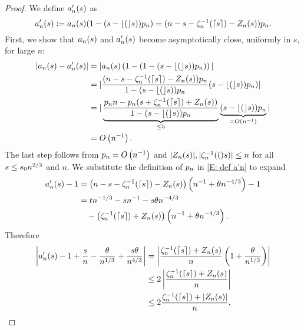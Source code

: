 \begin{proof} \label{P: limit An}
	We define $a'_n(s)$ as
	\begin{equation} \label{E: def a'n}
		a'_n(s) := a_n(s) (1 - (s - \lfloor(\rfloor s))p_n) = (n - s - \zeta^{-1}_n(\lceil s\rceil) - Z_n(s)) p_n.
	\end{equation}
	First, we show that $a_n(s)$ and $a'_n(s)$ become asymptotically close, uniformly in $s$, for large $n$:
	\begin{equation} \label{E: convergence an amn}
	\begin{aligned}
	|a_n(s) - a'_n(s)|
	&= |a_n(s)\left( 1-(1 - (s - \lfloor(\rfloor s))p_n) \right)| \\
	&= | \frac{(n - s - \zeta^{-1}_n(\lceil s\rceil) - Z_n(s))p_n}{1-(s - \lfloor(\rfloor s))p_n} (s - \lfloor(\rfloor s))p_n) | \\
	&= |\underbrace{\frac{p_n n - p_n(s + \zeta^{-1}_n(\lceil s\rceil) + Z_n(s))}{1-(s - \lfloor(\rfloor s))p_n}}_{\leq 5} 
		\underbrace{(s - \lfloor(\rfloor s))p_n}_{=O\left(n^{-1}\right)} |\\
	&= O\left(n^{-1}\right).
	\end{aligned}
	\end{equation}
	The last step follows from $p_n = O\left(n^{-1}\right)$ and $|Z_n(s)|, |\zeta^{-1}_n(()s)| \leq n$ for all $s \leq s_0n^{2 / 3}$ and $n$.
	We substitute the definition of $p_n$ in \eqref{E: def a'n} to expand
	\begin{align*}
	a'_n(s) - 1 
	&= \left( n - s - \zeta^{-1}_n(\lceil s\rceil) - Z_n(s) \right) \left( n^{-1} + \theta n^{-4 / 3} \right) - 1 \\
	&= tn^{-1 / 3} - sn^{-1} - s\theta n^{-4 / 3} \\
	&\quad - \left( \zeta^{-1}_n(\lceil s\rceil) + Z_n(s) \right) \left( n^{-1} + \theta n^{-4 / 3} \right).
	\end{align*}
	Therefore
	\begin{equation} \label{E: an zeta Z / n} 
	\begin{aligned}
	\left| a'_n(s) - 1 + \frac{s}{n} - \frac{\theta}{n^{1 / 3}} + \frac{s\theta}{n^{4 / 3}} \right|
	&= \left| \frac{\zeta^{-1}_n(\lceil s\rceil) + Z_n(s)}{n} \left( 1 + \frac{\theta}{n^{1 / 3}} \right) \right| \\
	&\leq 2 \left| \frac{\zeta^{-1}_n(\lceil s\rceil) + Z_n(s)}{n} \right| \\
	&\leq 2 \frac{\zeta^{-1}_n(\lceil s\rceil) + |Z_n(s)|}{n} ,  
	\end{aligned}
	\end{equation}

\end{proof}
